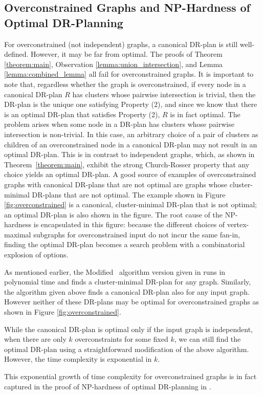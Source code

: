 \subsection{Overconstrained Graphs and NP-Hardness of Optimal DR-Planning}
\label{sec:drp:overconstrained}

For overconstrained (not independent) graphs, a canonical DR-plan is still well-defined.
However, it may be far from optimal. The proofs of Theorem \ref{theorem:main}, Observation \ref{lemma:union_intersection}, and Lemma \ref{lemma:combined_lemma} all fail for overconstrained graphs.
It is important to note that, regardless whether the graph is overconstrained, if every node in a canonical DR-plan $R$ has clusters whose pairwise intersection is trivial, then the DR-plan is the unique one satisfying Property (2), and since we know that there is an optimal DR-plan that satisfies Property (2), $R$ is in fact optimal. The problem arises when some node in a DR-plan has clusters whose pairwise intersection is non-trivial.
In this case, an arbitrary choice of a pair of clusters as children of an overconstrained node in a canonical DR-plan may not result in an optimal DR-plan. This is in contrast to independent graphs, which, as shown in Theorem~\ref{theorem:main}, exhibit the strong Church-Rosser property that any choice yields an optimal DR-plan.
A good source of examples of overconstrained graphs with canonical DR-plans that are not optimal are graphs whose cluster-minimal DR-plans that are not optimal. The example shown in Figure \ref{fig:overconstrained} is a canonical, cluster-minimal DR-plan that is not optimal; an optimal DR-plan is also shown in the figure.
The root cause of the NP-hardness is encapsulated in this figure: because the different choices of vertex-maximal subgraphs for overconstrained input do not incur the same fan-in, finding the optimal DR-plan becomes a search problem with a combinatorial explosion of options.


As mentioned earlier, the Modified \frontier\ algorithm
version given in \cite{lomonosov2004graph} runs in polynomial time and finds a cluster-minimal DR-plan for any graph.
Similarly, the algorithm given above finds a canonical DR-plan also for any input graph.  However neither of these DR-plans may be optimal for overconstrained graphs as shown in Figure \ref{fig:overconstrained}.

While the canonical DR-plan is optimal only if the input graph is independent, when there are only $k$ overconstraints for some fixed $k$, we can still find the optimal DR-plan using a straightforward modification of the above algorithm. However, the time complexity is exponential in $k$.

This exponential growth of time complexity for overconstrained graphs is in fact captured in the proof of NP-hardness of optimal DR-planning in \cite{sitharam2005combinatorial, lomonosov2004graph}.
